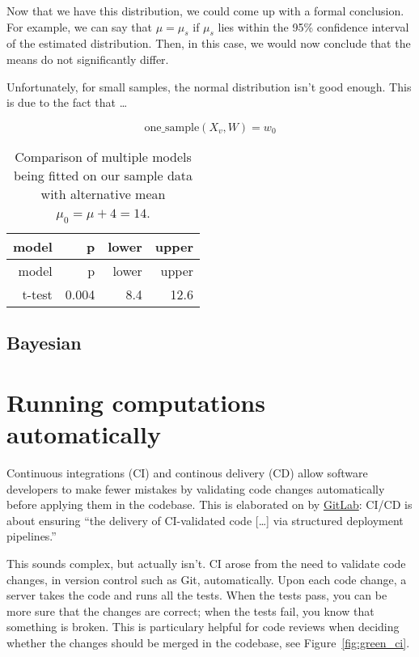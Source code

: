 \documentclass[
  14pt
  american,
  paper=a4,
  ,captions=tableheading
]{scrbook}
\begin{document}
Now that we have this distribution, we could come up with a formal
conclusion. For example, we can say that \(\mu = \mu_s\) if \(\mu_s\)
lies within the 95\% confidence interval of the estimated distribution.
Then, in this case, we would now conclude that the means do not
significantly differ.

Unfortunately, for small samples, the normal distribution isn't good
enough. This is due to the fact that \ldots{}

\[ \text{one\_sample}(X_v, W) = w_0 \]

\hypertarget{tbl:one_sample_tests}{}
\begin{longtable}[]{@{}rrrr@{}}
\caption{\label{tbl:one_sample_tests}Comparison of multiple models being
fitted on our sample data with alternative mean
\(\mu_0 = μ + 4 = 14\).}\tabularnewline
\toprule
model & p & lower & upper \\
\midrule
\endfirsthead
\toprule
model & p & lower & upper \\
\midrule
\endhead
t-test & 0.004 & 8.4 & 12.6 \\
\bottomrule
\end{longtable}

\hypertarget{sec:bayesian}{%
\section{Bayesian}\label{sec:bayesian}}

\hypertarget{sec:ci}{%
\chapter{Running computations automatically}\label{sec:ci}}

Continuous integrations (CI) and continous delivery (CD) allow software
developers to make fewer mistakes by validating code changes
automatically before applying them in the codebase. This is elaborated
on by
\href{https://about.gitlab.com/stages-devops-lifecycle/continuous-integration/}{GitLab}:
CI/CD is about ensuring ``the delivery of CI-validated code {[}\ldots{]}
via structured deployment pipelines.''

This sounds complex, but actually isn't. CI arose from the need to
validate code changes, in version control such as Git, automatically.
Upon each code change, a server takes the code and runs all the tests.
When the tests pass, you can be more sure that the changes are correct;
when the tests fail, you know that something is broken. This is
particulary helpful for code reviews when deciding whether the changes
should be merged in the codebase, see Figure~\ref{fig:green_ci}.
\end{document}
